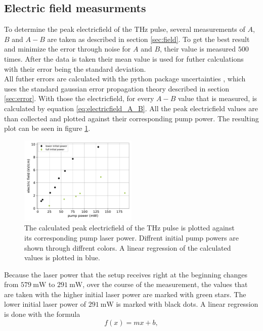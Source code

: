 \subsection{Electric field measurments}
\FloatBarrier
To determine the peak electricfield of the $\si{\tera\hertz}$ pulse, several measurements of $A$, $B$ and $A-B$ are taken as described in section \ref{sec:field}.
To get the best result and minimize the error through noise for $A$ and $B$, their value is measured $500$ times.
After the data is taken their mean value is used for futher calculations with their error being the standard deviation.
\\
All futher errors are calculated with the python package uncertainties \cite{uncertainties}, which uses the standard gaussian error propagation theory described in section \ref{sec:error}.
With those the electricfield, for every $A-B$ value that is measured, is calculated by equation \ref{eq:electricfield_A_B}.
All the peak electricfield values are than collected and plotted against their corresponding pump power.
The resulting plot can be seen in figure \ref{fig:znte_electricfield}.
\\
\begin{figure}
    \centering
    \includegraphics[width=0.5\textwidth]{Plots/eltric_field_ZnTe.pdf}
    \caption{The calculated peak electricfield of the $\si{\tera\hertz}$ pulse is plotted against its corresponding pump laser power.
    Diffrent initial pump powers are shown through diffrent colors.
    A linear regression of the calculated values is plotted in blue.}
    \label{fig:znte_electricfield}
\end{figure}
Because the laser power that the setup receives right at the beginning changes from $\SI{579}{\milli\W}$ to $\SI{291}{\milli\W}$, over the course of the measurement, the values that are taken with the higher initial laser power are marked with green stars.
The lower initial laser power of $\SI{291}{\milli\W}$ is marked with black dots.
A linear regression is done with the formula
\begin{equation}
    f(x) = mx + b,
    \label{eq:linear}
\end{equation}
